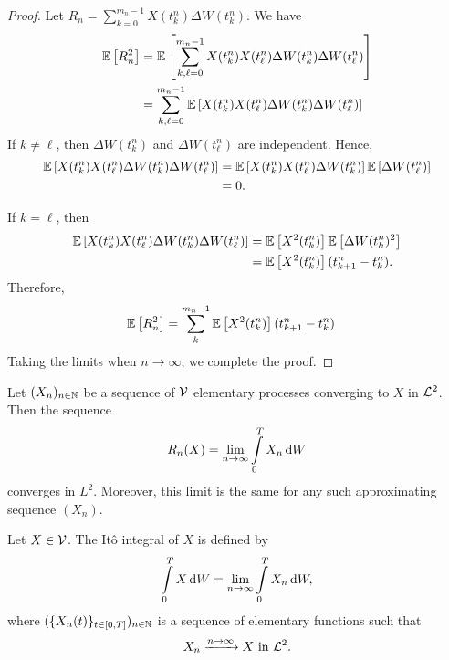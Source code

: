 \begin{proof}
  Let $R_n=\sum\limits_{k=0}^{m_n-1} X(t_k^n)\Delta W(t^n_{k})$. We have
  \begin{align*}
    \mathbb{E}\left[R_n^2\right]
     & = \mathbb{E}\left[\sum\limits_{k,\ell = 0}^{m_n-1}X(t_k^n)X(t_\ell^n)\Delta W(t^n_{k}) \Delta W(t^n_{\ell})\right] \\
     & = \sum\limits_{k,\ell = 0}^{m_n-1}\mathbb{E}\left[X(t_k^n)X(t_\ell^n)\Delta W(t^n_{k}) \Delta W(t^n_{\ell})\right]
  \end{align*}
  If $k \ne \ell$, then $\Delta W(t^n_{k})$ and $\Delta W(t^n_{\ell})$ are independent. Hence,
  \begin{align*}
    \mathbb{E}\left[X(t_k^n)X(t_\ell^n)\Delta W(t^n_{k}) \Delta W(t^n_{\ell})\right]
     & = \mathbb{E}\left[X(t_k^n)X(t_\ell^n)\Delta W(t^n_{k})\right]\mathbb{E}\left[\Delta W(t^n_{\ell})\right] \\
     & =0.
  \end{align*}

  If $k = \ell$, then
  \begin{align*}
    \mathbb{E}\left[X(t_k^n)X(t_\ell^n)\Delta W(t^n_{k}) \Delta W(t^n_{\ell})\right]
     & =\mathbb{E}\left[X^2(t_k^n)\right] \mathbb{E}\left[\Delta W(t^n_{k})^2\right] \\
     & = \mathbb{E}\left[X^2(t_k^n)\right] (t_{k+1}^n-t_k^n).
  \end{align*}
  Therefore,
  \begin{align*}
    \mathbb{E}\left[R_n^2\right]
     & =\sum\limits_{k}^{m_n-1} \mathbb{E}\left[X^2(t_k^n)\right] (t_{k+1}^n-t_k^n)
  \end{align*}
  Taking the limits when $n\to\infty$, we complete the proof.
\end{proof}

\begin{theorem}
  Let $(X_n)_{n\in\mathbb{N}}$ be a sequence of $\mathcal{V}$ elementary processes converging to $X$ in $\mathcal{L}^2$. Then the sequence
  $$R_n(X) = \lim\limits_{n\to\infty}\int\limits_0^T X_n\,\mathrm{d} W$$
  converges in $L^2$. Moreover, this limit is the same for any such approximating sequence $(X_n)$.
\end{theorem}



\begin{definition}
  Let $X\in \mathcal{V}$. The Itô integral of $X$ is defined by
  \begin{equation}
    \int\limits_0^T X\,\mathrm{d} W =  \lim\limits_{n\to\infty}\int\limits_0^T X_n\,\mathrm{d} W,
  \end{equation}
  where $(\{X_n(t)\}_{t\in[0,T]})_{n\in\mathbb{N}}$ is a sequence of elementary functions such that
  $$X_n \xrightarrow{n\to\infty} X \text{ in } \mathcal{L}^2.$$
\end{definition}

